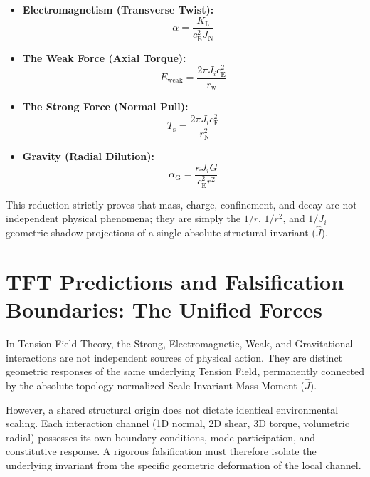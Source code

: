\begin{itemize}
    \item \textbf{Electromagnetism (Transverse Twist):} 
    \begin{equation}
        \alpha = \frac{K_{\mathrm{L}}}{c_{\mathrm{E}}^2 J_{\mathrm{N}}}
    \end{equation}
    \item \textbf{The Weak Force (Axial Torque):} 
    \begin{equation}
        E_{\mathrm{weak}} = \frac{2\pi J_i c_{\mathrm{E}}^2}{r_{\mathrm{w}}}
    \end{equation}
    \item \textbf{The Strong Force (Normal Pull):} 
    \begin{equation}
        T_{\mathrm{s}} = \frac{2\pi J_i c_{\mathrm{E}}^2}{r_{\mathrm{N}}^2}
    \end{equation}
    \item \textbf{Gravity (Radial Dilution):} 
    \begin{equation}
        \alpha_{\mathrm{G}} = \frac{\kappa J_i G}{c_{\mathrm{E}}^2 r^2}
    \end{equation}
\end{itemize}

This reduction strictly proves that mass, charge, confinement, and decay are not independent physical phenomena; they are simply the $1/r$, $1/r^2$, and $1/J_i$ geometric shadow-projections of a single absolute structural invariant ($\hat{J}$).

\section{TFT Predictions and Falsification Boundaries: The Unified Forces}
\label{sec:tft_unification_predictions}

In Tension Field Theory, the Strong, Electromagnetic, Weak, and Gravitational interactions are not independent sources of physical action. They are distinct geometric responses of the same underlying Tension Field, permanently connected by the absolute topology-normalized Scale-Invariant Mass Moment ($\hat{J}$).

However, a shared structural origin does not dictate identical environmental scaling. Each interaction channel (1D normal, 2D shear, 3D torque, volumetric radial) possesses its own boundary conditions, mode participation, and constitutive response. A rigorous falsification must therefore isolate the underlying invariant from the specific geometric deformation of the local channel.

